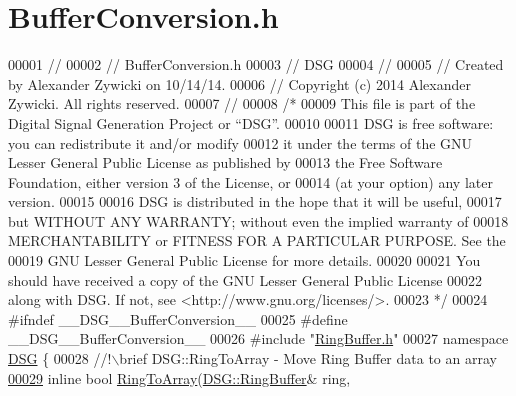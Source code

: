 \hypertarget{_buffer_conversion_8h_source}{\section{Buffer\+Conversion.\+h}
\label{_buffer_conversion_8h_source}
}

\begin{DoxyCode}
00001 \textcolor{comment}{//}
00002 \textcolor{comment}{//  BufferConversion.h}
00003 \textcolor{comment}{//  DSG}
00004 \textcolor{comment}{//}
00005 \textcolor{comment}{//  Created by Alexander Zywicki on 10/14/14.}
00006 \textcolor{comment}{//  Copyright (c) 2014 Alexander Zywicki. All rights reserved.}
00007 \textcolor{comment}{//}
00008 \textcolor{comment}{/*}
00009 \textcolor{comment}{ This file is part of the Digital Signal Generation Project or “DSG”.}
00010 \textcolor{comment}{}
00011 \textcolor{comment}{ DSG is free software: you can redistribute it and/or modify}
00012 \textcolor{comment}{ it under the terms of the GNU Lesser General Public License as published by}
00013 \textcolor{comment}{ the Free Software Foundation, either version 3 of the License, or}
00014 \textcolor{comment}{ (at your option) any later version.}
00015 \textcolor{comment}{}
00016 \textcolor{comment}{ DSG is distributed in the hope that it will be useful,}
00017 \textcolor{comment}{ but WITHOUT ANY WARRANTY; without even the implied warranty of}
00018 \textcolor{comment}{ MERCHANTABILITY or FITNESS FOR A PARTICULAR PURPOSE.  See the}
00019 \textcolor{comment}{ GNU Lesser General Public License for more details.}
00020 \textcolor{comment}{}
00021 \textcolor{comment}{ You should have received a copy of the GNU Lesser General Public License}
00022 \textcolor{comment}{ along with DSG.  If not, see <http://www.gnu.org/licenses/>.}
00023 \textcolor{comment}{ */}
00024 \textcolor{preprocessor}{#ifndef \_\_DSG\_\_BufferConversion\_\_}
00025 \textcolor{preprocessor}{#define \_\_DSG\_\_BufferConversion\_\_}
00026 \textcolor{preprocessor}{#include "\hyperlink{_ring_buffer_8h}{RingBuffer.h}"}
00027 \textcolor{keyword}{namespace }\hyperlink{namespace_d_s_g}{DSG} \{\textcolor{comment}{}
00028 \textcolor{comment}{    //!\(\backslash\)brief DSG::RingToArray - Move Ring Buffer data to an array}
\hypertarget{_buffer_conversion_8h_source_l00029}{}\hyperlink{namespace_d_s_g_a4049a445d7cb9ee4f9140bdfdbd5e11c}{00029} \textcolor{comment}{}    \textcolor{keyword}{inline} \textcolor{keywordtype}{bool} \hyperlink{namespace_d_s_g_a4049a445d7cb9ee4f9140bdfdbd5e11c}{RingToArray}(\hyperlink{class_d_s_g_1_1_ring_buffer}{DSG::RingBuffer}& ring,

\end{DoxyCode}

